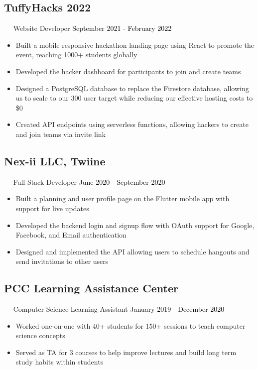 \documentclass{article}
\newcommand{\resumesection}[3]{
    \subsection*{#1}
    \ 
    \ 
    \small
    \textcolor{csufgrey}{#2}
    \normalsize
    \hfill
    \textcolor{black}{#3}
    \normalsize
}
\begin{document}
\resumesection{TuffyHacks 2022}{Website Developer}{September 2021 - February 2022}
\begin{itemize}
    \item Built a mobile responsive hackathon landing page using React to promote the event, reaching 1000+ students globally
    \item Developed the hacker dashboard for participants to join and create teams
    \item Designed a PostgreSQL database to replace the Firestore database, allowing us to scale to our 300 user target while reducing our effective hosting costs to \$0
    \item Created API endpoints using serverless functions, allowing hackers to create and join teams via invite link
\end{itemize}
\resumesection{Nex-ii LLC, Twiine}{Full Stack Developer}{June 2020 - September 2020}
\begin{itemize}
    \item Built a planning and user profile page on the Flutter mobile app with support for live updates
    \item Developed the backend login and signup flow with OAuth support for Google, Facebook, and Email authentication
    \item Designed and implemented the API allowing users to schedule hangouts and send invitations to other users
\end{itemize}
\resumesection{PCC Learning Assistance Center}{Computer Science Learning Assistant}{January 2019 - December 2020}
\begin{itemize}
    \item Worked one-on-one with 40+ students for 150+ sessions to teach computer science concepts
    \item Served as TA for 3 courses to help improve lectures and build long term study habits within students
\end{itemize}
\end{document}
